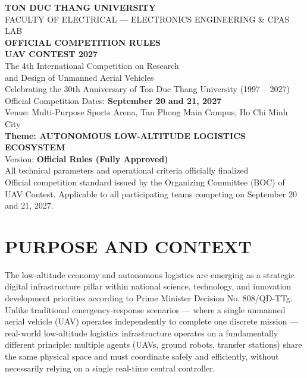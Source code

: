 \documentclass[12pt,a4paper]{article}
\begin{document}
\begin{titlepage}
\centering
\vspace*{1.2cm}
{\Large\bfseries TON DUC THANG UNIVERSITY}\\[0.2cm]
{\large FACULTY OF ELECTRICAL — ELECTRONICS ENGINEERING \& CPAS LAB}\\[1.6cm]

{\Huge\bfseries OFFICIAL COMPETITION RULES}\\[0.4cm]
{\Large\bfseries UAV CONTEST 2027}\\[0.6cm]
{\large The 4th International Competition on Research}\\
{\large and Design of Unmanned Aerial Vehicles}\\[0.6cm]
{\large Celebrating the 30th Anniversary of Ton Duc Thang University (1997 -- 2027)}\\[0.3cm]
{\large Official Competition Dates: \textbf{September 20 and 21, 2027}}\\[0.3cm]
{\normalsize Venue: Multi-Purpose Sports Arena, Tan Phong Main Campus, Ho Chi Minh City}\\[2.0cm]

{\large\bfseries Theme: AUTONOMOUS LOW-ALTITUDE LOGISTICS ECOSYSTEM}\\[2.5cm]

{\normalsize Version: \textbf{Official Rules (Fully Approved)}}\\[0.3cm]
{\normalsize All technical parameters and operational criteria officially finalized}\\[2cm]

\vfill
{\small Official competition standard issued by the Organizing Committee (BOC) of UAV Contest. Applicable to all participating teams competing on September 20 and 21, 2027.}
\end{titlepage}

\tableofcontents
\newpage

\section{PURPOSE AND CONTEXT}

The low-altitude economy and autonomous logistics are emerging as a strategic digital infrastructure pillar within national science, technology, and innovation development priorities according to Prime Minister Decision No. 808/QD-TTg. Unlike traditional emergency-response scenarios — where a single unmanned aerial vehicle (UAV) operates independently to complete one discrete mission — real-world low-altitude logistics infrastructure operates on a fundamentally different principle: multiple agents (UAVs, ground robots, transfer stations) share the same physical space and must coordinate safely and efficiently, without necessarily relying on a single real-time central controller.
\end{document}

